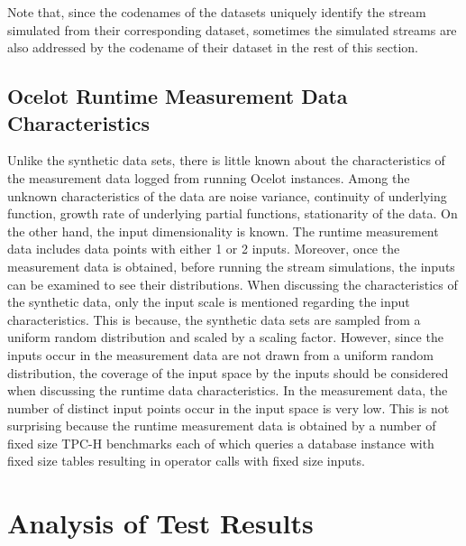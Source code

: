 Note that, since the codenames of the datasets uniquely identify the stream simulated from their corresponding dataset, sometimes the simulated streams are also addressed by the codename of their dataset in the rest of this section.

\subsection{Ocelot Runtime Measurement Data Characteristics}

Unlike the synthetic data sets, there is little known about the characteristics of the measurement data logged from running Ocelot instances. Among the unknown characteristics of the data are noise variance, continuity of underlying function, growth rate of underlying partial functions, stationarity of the data. On the other hand, the input dimensionality is known. The runtime measurement data includes data points with either 1 or 2 inputs. Moreover, once the measurement data is obtained, before running the stream simulations, the inputs can be examined to see their distributions. When discussing the characteristics of the synthetic data, only the input scale is mentioned regarding the input characteristics. This is because, the synthetic data sets are sampled from a uniform random distribution and scaled by a scaling factor. However, since the inputs occur in the measurement data are not drawn from a uniform random distribution, the coverage of the input space by the inputs should be considered when discussing the runtime data characteristics. In the measurement data, the number of distinct input points occur in the input space is very low. This is not surprising because the runtime measurement data is obtained by a number of fixed size TPC-H benchmarks each of which queries a database instance with fixed size tables resulting in operator calls with fixed size inputs.

\section{Analysis of Test Results}

